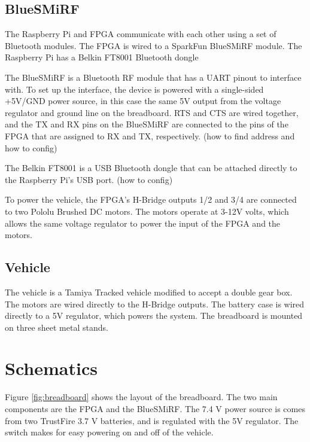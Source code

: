 \documentclass[12pt]{article}
\begin{document}
\subsection{BlueSMiRF}
The Raspberry Pi and FPGA communicate with each other using a set of Bluetooth modules.  The FPGA is wired to a SparkFun BlueSMiRF module.  The Raspberry Pi has a Belkin FT8001 Bluetooth dongle

The BlueSMiRF is a Bluetooth RF module that has a UART pinout to interface with.  To set up the interface, the device is powered with a single-sided +5V/GND power source, in this case the same 5V output from the voltage regulator and ground line on the breadboard.  RTS and CTS are wired together, and the TX and RX pins on the BlueSMiRF are connected to the pins of the FPGA that are assigned to RX and TX, respectively. (how to find address and how to config)

The Belkin FT8001 is a USB Bluetooth dongle that can be attached directly to the Raspberry Pi's USB port. (how to config)

To power the vehicle, the FPGA's H-Bridge outputs 1/2 and 3/4 are connected to two Pololu Brushed DC motors.  The motors operate at 3-12V volts, which allows the same voltage regulator to power the input of the FPGA and the motors.
\subsection{Vehicle}

The vehicle is a Tamiya Tracked vehicle modified to accept a double gear box. The motors are wired directly to the H-Bridge outputs. The battery case is wired directly to a 5V regulator, which powers the system. The breadboard is mounted on three sheet metal stands.

\section{Schematics}

Figure \ref{fig:breadboard} shows the layout of the breadboard. The two main components are the FPGA and the BlueSMiRF. The 7.4 V power source is comes from two TrustFire 3.7 V batteries, and is regulated with the 5V regulator. The switch makes for easy powering on and off of the vehicle.
\end{document}

